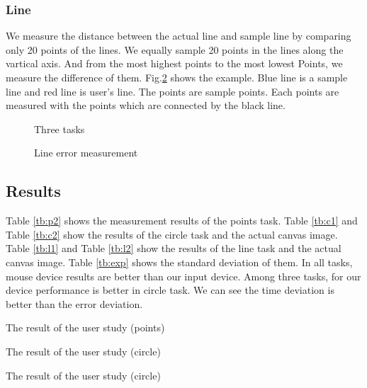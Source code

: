 \subsubsection{Line}
We measure the distance between the actual line and sample line by comparing only 20 points of the lines. We equally sample 20 points in the lines along the vartical axis. And from the most highest points to the most lowest Points, we measure the difference of them.
Fig.\ref{linem} shows the example. Blue line is a sample line and red line is user's line. The points are sample points. Each points are measured with the points which are connected by the black line.
\begin{figure}

 \caption{Three tasks}
 \label{task}
\end{figure}

\begin{figure}[htbp]
 \centering
 
 \caption{Line error measurement}
 \label{linem}
\end{figure}


\subsection{Results}
Table \ref{tb:p2} shows the measurement results of the points task. Table \ref{tb:c1} and Table \ref{tb:c2} show the results of the circle task and the actual canvas image. Table \ref{tb:l1} and Table \ref{tb:l2} show the results of the line task and the actual canvas image. Table \ref{tb:exp} shows the standard deviation of them. In all tasks, mouse device results are better than our input device. Among three tasks, for our device performance is better in circle task. We can see the time deviation is better than the error deviation.

\begin{table}[htbp]
 \centering
 \caption{The result of the user study (points)}
 \label{tb:p2}
 
\end{table}


\begin{table}[htbp]
 \centering
 \caption{The result of the user study (circle)}
 \label{tb:c1}
 
\end{table}



\begin{table}[htbp]
 \centering
 \caption{The result of the user study (circle)}
 \label{tb:c2}
 
\end{table}

